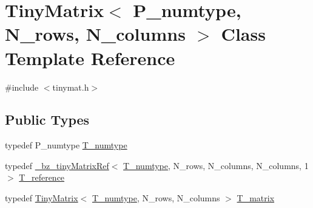 \hypertarget{classTinyMatrix}{}\section{Tiny\+Matrix$<$ P\+\_\+numtype, N\+\_\+rows, N\+\_\+columns $>$ Class Template Reference}
\label{classTinyMatrix}


{\ttfamily \#include $<$tinymat.\+h$>$}

\subsection*{Public Types}
\begin{DoxyCompactItemize}
\item 
typedef P\+\_\+numtype \hyperlink{classTinyMatrix_ae4f83dd6be68ad496c360c01813ff356}{T\+\_\+numtype}
\item 
typedef \hyperlink{class__bz__tinyMatrixRef}{\+\_\+bz\+\_\+tiny\+Matrix\+Ref}$<$ \hyperlink{classTinyMatrix_ae4f83dd6be68ad496c360c01813ff356}{T\+\_\+numtype}, N\+\_\+rows, N\+\_\+columns, N\+\_\+columns, 1 $>$ \hyperlink{classTinyMatrix_ab0a7707d797ae2d32ab8b4bbfe68f001}{T\+\_\+reference}
\item 
typedef \hyperlink{classTinyMatrix}{Tiny\+Matrix}$<$ \hyperlink{classTinyMatrix_ae4f83dd6be68ad496c360c01813ff356}{T\+\_\+numtype}, N\+\_\+rows, N\+\_\+columns $>$ \hyperlink{classTinyMatrix_a5ecab8dfaf533005997a64497f41cf5a}{T\+\_\+matrix}
\end{DoxyCompactItemize}
